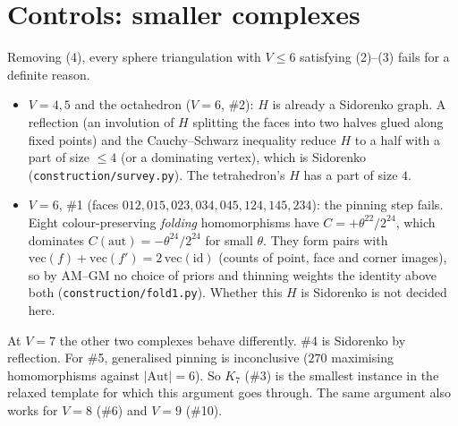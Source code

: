 \documentclass[11pt]{amsart}
\theoremstyle{definition}
\theoremstyle{remark}
\newcommand{\1}{\mathbf 1}
\begin{document}
\section{Controls: smaller complexes}
Removing (4), every sphere triangulation with $V\le6$ satisfying (2)--(3) fails for a definite reason.
\begin{itemize}
\item $V=4,5$ and the octahedron ($V=6$, \#2): $H$ is already a Sidorenko graph. A reflection (an involution of $H$
splitting the faces into two halves glued along fixed points) and the Cauchy--Schwarz inequality reduce $H$ to a half with
a part of size $\le4$ (or a dominating vertex), which is Sidorenko \cite{sidorenko1991,cfs2010}
(\texttt{construction/survey.py}). The tetrahedron's $H$ has a part of size $4$.
\item $V=6$, \#1 (faces $012,015,023,034,045,124,145,234$): the pinning step fails. Eight colour-preserving
\emph{folding} homomorphisms have $C=+\theta^{22}/2^{24}$, which dominates $C(\mathrm{aut})=-\theta^{24}/2^{24}$ for small $\theta$. They form pairs with
$\mathrm{vec}(f)+\mathrm{vec}(f')=2\,\mathrm{vec}(\mathrm{id})$ (counts of point, face and corner images), so by AM--GM no choice of priors and thinning weights the
identity above both (\texttt{construction/fold1.py}). Whether this $H$ is Sidorenko is not decided here.
\end{itemize}
At $V=7$ the other two complexes behave differently. \#4 is Sidorenko by reflection. For \#5, generalised
pinning is inconclusive ($270$ maximising homomorphisms against $|\mathrm{Aut}|=6$). So $K_7$ (\#3) is the smallest instance
in the relaxed template for which this argument goes through. The same argument also works for $V=8$ (\#6) and $V=9$ (\#10).
\end{document}
